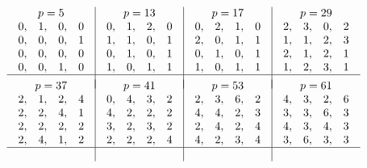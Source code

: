 \documentclass{book}
\theoremstyle{plain}
\theoremstyle{remark}
\begin{document}
\[ \begin{array}{c|c|c|c}
p=5 & p=13 & p=17 & p=29 \\
\begin{array}{llll} 0,&1,&0,&0\\0,&0,&0,&1\\0,&0,&0,&0\\0,&0,&1,&0 \end{array} &
\begin{array}{llll} 0,&1,&2,&0\\1,&1,&0,&1\\0,&1,&0,&1\\1,&0,&1,&1 \end{array}&
\begin{array}{llll} 0,&2,&1,&0\\2,&0,&1,&1\\0,&1,&0,&1\\1,&0,&1,&1 \end{array} &
\begin{array}{llll} 2,&3,&0,&2\\1,&1,&2,&3\\2,&1,&2,&1\\1,&2,&3,&1 \end{array} \\ \hline &&& \\[-8pt]
p=37 & p=41 & p=53 & p=61 \\
\begin{array}{llll} 2,&1,&2,&4\\2,&2,&4,&1\\2,&2,&2,&2\\2,&4,&1,&2 \end{array} &
\begin{array}{llll} 0,&4,&3,&2\\4,&2,&2,&2\\3,&2,&3,&2\\2,&2,&2,&4 \end{array}&
\begin{array}{llll} 2,&3,&6,&2\\4,&4,&2,&3\\2,&4,&2,&4\\4,&2,&3,&4 \end{array} &
\begin{array}{llll} 4,&3,&2,&6\\3,&3,&6,&3\\4,&3,&4,&3\\3,&6,&3,&3 \end{array} \\ \hline &&& \\[-8pt]

\end{array}\]
\end{document}
